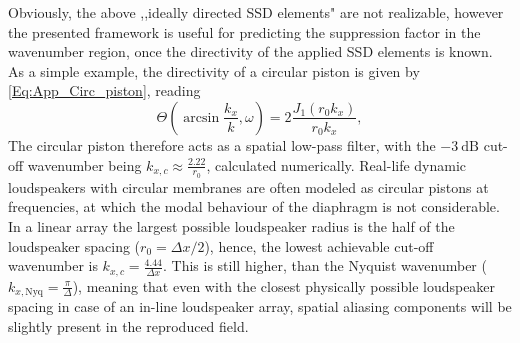 \vspace{3mm}
Obviously, the above ,,ideally directed SSD elements" are not realizable, however the presented framework is useful for predicting the suppression
factor in the wavenumber region, once the directivity of the applied SSD elements is known.
As a simple example, the directivity of a circular piston is given by \eqref{Eq:App_Circ_piston}, reading
\begin{equation}
\Theta(\arcsin \frac{k_x}{k},\omega) = 2\frac{J_1\left( r_0 k_x\right)}{r_0 k_x},
\end{equation}
The circular piston therefore acts as a spatial low-pass filter, with the $-3~\mathrm{dB}$ cut-off wavenumber being $k_{x,c} \approx \frac{2.22}{r_0}$, calculated numerically.
Real-life dynamic loudspeakers with circular membranes are often modeled as circular pistons at frequencies, at which the modal behaviour of the diaphragm is not considerable.
In a linear array the largest possible loudspeaker radius is the half of the loudspeaker spacing ($r_0 = \Delta x/2$), hence, the lowest achievable cut-off wavenumber is 
$k_{x,c} = \frac{4.44}{\Delta x}$.
This is still higher, than the Nyquist wavenumber ($k_{x,\mathrm{Nyq}} = \frac{\pi}{\Delta}$), meaning that even with the closest physically possible loudspeaker spacing in case of an in-line loudspeaker array, spatial aliasing components will be slightly present in the reproduced field.
